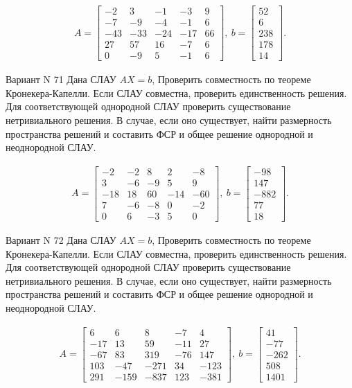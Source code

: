 \documentclass[11pt]{report}
\begin{document}
\begin{align*}
 A = \left[\begin{matrix}-2 & 3 & -1 & -3 & 9\\-7 & -9 & -4 & -1 & 6\\-43 & -33 & -24 & -17 & 66\\27 & 57 & 16 & -7 & 6\\0 & -9 & 5 & -1 & 6\end{matrix}\right],
\ b = \left[\begin{matrix}52\\6\\238\\178\\14\end{matrix}\right]. 
 \end{align*}

Вариант N 71
Дана СЛАУ $AX = b$,
Проверить совместность по теореме Кронекера-Капелли. Если СЛАУ совместна, проверить единственность решения.
Для соответствующей однородной СЛАУ проверить существование нетривиального решения. В случае, если оно существует,
найти размерность пространства решений и составить ФСР и общее решение однородной  и неоднородной СЛАУ.


\begin{align*}
 A = \left[\begin{matrix}-2 & -2 & 8 & 2 & -8\\3 & -6 & -9 & 5 & 9\\-18 & 18 & 60 & -14 & -60\\7 & -6 & -8 & 0 & -2\\0 & 6 & -3 & 5 & 0\end{matrix}\right],
\ b = \left[\begin{matrix}-98\\147\\-882\\77\\18\end{matrix}\right]. 
 \end{align*}

Вариант N 72
Дана СЛАУ $AX = b$,
Проверить совместность по теореме Кронекера-Капелли. Если СЛАУ совместна, проверить единственность решения.
Для соответствующей однородной СЛАУ проверить существование нетривиального решения. В случае, если оно существует,
найти размерность пространства решений и составить ФСР и общее решение однородной  и неоднородной СЛАУ.


\begin{align*}
 A = \left[\begin{matrix}6 & 6 & 8 & -7 & 4\\-17 & 13 & 59 & -11 & 27\\-67 & 83 & 319 & -76 & 147\\103 & -47 & -271 & 34 & -123\\291 & -159 & -837 & 123 & -381\end{matrix}\right],
\ b = \left[\begin{matrix}41\\-77\\-262\\508\\1401\end{matrix}\right]. 
 \end{align*}
\end{document}

